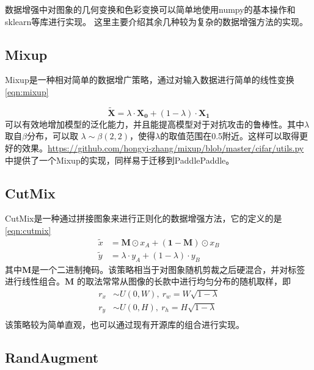 \documentclass[a4paper,twoside,zihao=5,UTF8]{ctexrep}
\newcommand{\bvec}[1]{\mathbf{#1}}
\begin{document}
数据增强中对图象的几何变换和色彩变换可以简单地使用numpy的基本操作和sklearn等库进行实现。
这里主要介绍其余几种较为复杂的数据增强方法的实现。

\subsection{Mixup}

Mixup\cite{mixup}是一种相对简单的数据增广策略，通过对输入数据进行简单的线性变换\eqref{eqn:mixup}

\begin{equation}
    \label{eqn:mixup}
    \widetilde{\bvec{X}}=\lambda\cdot\bvec{X_0}+(1-\lambda)\cdot\bvec{X_1}
\end{equation}
可以有效地增加模型的泛化能力，并且能提高模型对于对抗攻击的鲁棒性。其中$\lambda$取自$\beta$分布，可以取
$\lambda \sim \beta(2,2)$，使得$\lambda$的取值范围在0.5附近。这样可以取得更好的效果。\url{https://github.com/hongyi-zhang/mixup/blob/master/cifar/utils.py}
中提供了一个Mixup的实现，同样易于迁移到PaddlePaddle。

\subsection{CutMix}
CutMix\cite{cutmix}是一种通过拼接图象来进行正则化的数据增强方法，它的定义的是\eqref{eqn:cutmix}
\begin{equation}
    \label{eqn:cutmix}
    \begin{aligned}
        \widetilde{x}&=\bvec{M}\odot x_A+(\bvec{1}-\bvec{M})\odot x_B \\
        \widetilde{y}&=\lambda\cdot y_A+(1-\lambda)\cdot y_B 
    \end{aligned}
\end{equation}
其中$\bvec{M}$是一个二进制掩码。该策略相当于对图象随机剪裁之后硬混合，并对标签进行线性组合。$\bvec{M}$
的取法常常从图像的长款中进行均匀分布的随机取样，即
\begin{equation}
    \label{eqn:cutmix_mask}
    \begin{aligned}
        r_x &\sim U(0,W),\ r_w=W\sqrt{1-\lambda} \\
        r_y &\sim U(0,H),\ r_h=H\sqrt{1-\lambda} \\
    \end{aligned}
\end{equation}
该策略较为简单直观，也可以通过现有开源库的组合进行实现。

\subsection{RandAugment}
\end{document}
